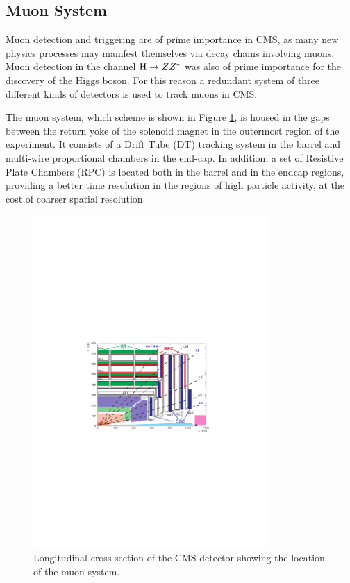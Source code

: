 \subsection{Muon System}

Muon detection and triggering are of prime importance in CMS, as many new physics processes may manifest themselves via decay chains involving muons. 
Muon detection in the channel $\mathrm{H}\rightarrow ZZ^\ast$ was also of prime importance for the discovery of the Higgs boson. %
For this reason a redundant system of three different kinds of detectors is used to track muons in CMS. 

The muon system, which scheme is shown in Figure \ref{fig:mudet}, is housed in the gaps between the return yoke of the solenoid magnet in the outermost region of the experiment. It consists of a Drift Tube (DT) tracking system in the barrel and multi-wire proportional chambers in the end-cap. In addition, a set of Resistive Plate Chambers (RPC) is located both in the barrel and in the endcap regions, providing a better time resolution in the regions of high particle activity, at the cost of coarser spatial resolution. 

\begin{figure}
\begin{center}
\includegraphics[angle=-0,width=0.8\textwidth]{2_LHC_and_CMS/pics/mudet.pdf}
\caption{Longitudinal cross-section of the CMS detector showing the location of the muon system.
\label{fig:mudet}
}
\end{center}
\end{figure}

